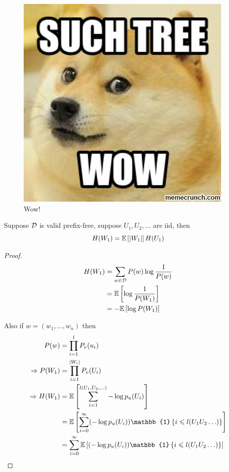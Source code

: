 \begin{figure}[!ht]
    \centering
    \includegraphics[scale=0.25]{figures/suchTree}
    \caption{Wow!}
\end{figure}

\FloatBarrier

\begin{lemma}
    Suppose $\mathcal{D}$ is valid prefix-free, suppose $U_1,U_2,\ldots$ are iid, then
    \[
        H(W_1) = \mathbb{E}\left[ \left\lvert W_1\right\rvert \right] H(U_1)
    \]
\end{lemma}
\begin{proof}
    \[
        \begin{aligned}
            H(W_1) &= \sum\limits_{w\in \mathcal{D}} P(w) \log \frac{1}{P(w)}\\
            &= \mathbb{E}\left[ \log\frac{1}{P(W_1)} \right]\\
            &= -\mathbb{E}\left[ \log P(W_1) \right]
        \end{aligned}            
    \]

    Also if $w=(w_1,\ldots,w_n)$ then
    \[
        \begin{aligned}
            P(w) &= \prod\limits_{i=1}^l P_v(u_i)\\
            \Ra P(W_1) &= \prod\limits_{i=1}^{\length{W_i}} P_v(U_i)\\
            \Ra H(W_1) &= \esp{\sum\limits_{i=1}^{l(U_1,U_2,\ldots)} - \log p_u(U_i)}\\
            &= \esp{\sum\limits_{i=0}^\infty (-\log p_u(U_i)) \mathbb{1}\set{i\leqslant l(U_1U_2\ldots)}}\\
            &= \sum_{i=0}^\infty \esp{ (-\log p_u(U_i)) \mathbb{1}\set{i\leqslant l(U_1U_2\ldots)}}
        \end{aligned}
    \]
\end{proof}

